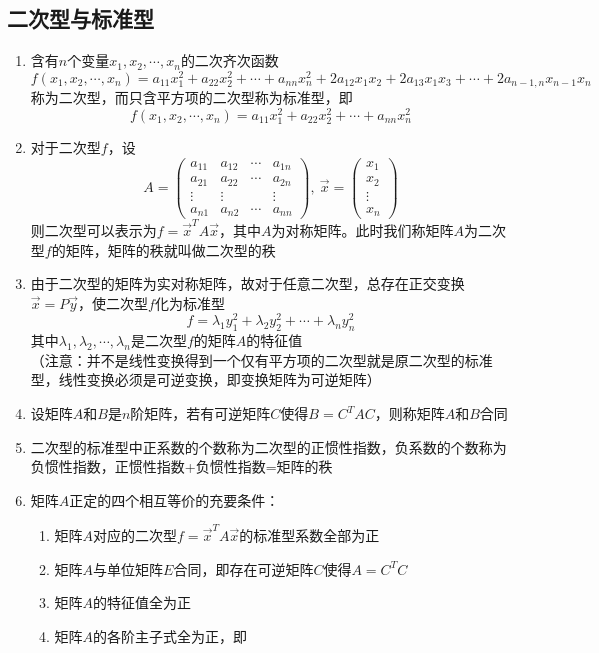 \documentclass[12pt,a4paper,UTF8]{book}
\begin{document}
\subsection{二次型与标准型}
\begin{enumerate}
\item 含有$n$个变量$x_1,x_2,\cdots,x_n$的二次齐次函数
\[f\left(x_1,x_2,\cdots,x_n\right)=a_{11}x_1^2+a_{22}x_2^2+\cdots+a_{nn}x_n^2+2a_{12}x_1x_2+2a_{13}x_1x_3+\cdots+2a_{n-1,n}x_{n-1}x_n\]
称为二次型，而只含平方项的二次型称为标准型，即
\[f\left(x_1,x_2,\cdots,x_n\right)=a_{11}x_1^2+a_{22}x_2^2+\cdots+a_{nn}x_n^2\]
\item 对于二次型$f$，设
\[A=\begin{pmatrix}a_{11}&a_{12}&\cdots&a_{1n}\\a_{21}&a_{22}&\cdots&a_{2n}\\\vdots&\vdots&\ &\vdots\\a_{n1}&a_{n2}&\cdots&a_{nn}\end{pmatrix},\ \vec{x}=\begin{pmatrix}x_1\\x_2\\\vdots\\x_n\end{pmatrix}\]
则二次型可以表示为$f=\vec{x}^TA\vec{x}$，其中$A$为对称矩阵。此时我们称矩阵$A$为二次型$f$的矩阵，矩阵的秩就叫做二次型的秩
\item 由于二次型的矩阵为实对称矩阵，故对于任意二次型，总存在正交变换$\vec{x}=P\vec{y}$，使二次型$f$化为标准型
\[f=\lambda_1y_1^2+\lambda_2y_2^2+\cdots+\lambda_ny_n^2\]
其中$\lambda_1,\lambda_2,\cdots,\lambda_n$是二次型$f$的矩阵$A$的特征值\\
（注意：并不是线性变换得到一个仅有平方项的二次型就是原二次型的标准型，线性变换必须是可逆变换，即变换矩阵为可逆矩阵）
\item 设矩阵$A$和$B$是$n$阶矩阵，若有可逆矩阵$C$使得$B=C^TAC$，则称矩阵$A$和$B$合同
\item 二次型的标准型中正系数的个数称为二次型的正惯性指数，负系数的个数称为负惯性指数，正惯性指数+负惯性指数=矩阵的秩
\item 矩阵$A$正定的四个相互等价的充要条件：
\begin{enumerate}
\item 矩阵$A$对应的二次型$f=\vec{x}^TA\vec{x}$的标准型系数全部为正
\item 矩阵$A$与单位矩阵$E$合同，即存在可逆矩阵$C$使得$A=C^TC$
\item 矩阵$A$的特征值全为正
\item 矩阵$A$的各阶主子式全为正，即

\end{enumerate}
\end{enumerate}
\end{document}
